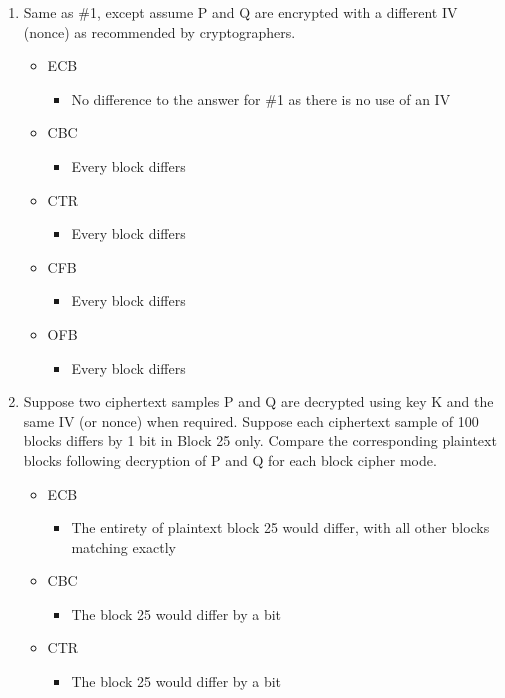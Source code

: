 \documentclass[11pt]{article}
\begin{document}
\begin{enumerate}
\begin{itemize}
\begin{itemize}
\end{itemize}
\end{itemize}
\item Same as \#1, except assume P and Q are encrypted with a different IV (nonce) as recommended by cryptographers.
\begin{itemize}
\item ECB
\begin{itemize}
\item No difference to the answer for \#1 as there is no use of an IV
\end{itemize}
\item CBC
\begin{itemize}
\item Every block differs
\end{itemize}
\item CTR
\begin{itemize}
\item Every block differs
\end{itemize}
\item CFB
\begin{itemize}
\item Every block differs
\end{itemize}
\item OFB
\begin{itemize}
\item Every block differs
\end{itemize}
\end{itemize}
\item Suppose two ciphertext samples P and Q are decrypted using key K and the same IV (or nonce) when required. Suppose each ciphertext sample of 100 blocks differs by 1 bit in Block 25 only. Compare the corresponding plaintext blocks following decryption of P and Q for each block cipher mode.
\begin{itemize}
\item ECB
\begin{itemize}
\item The entirety of plaintext block 25 would differ, with all other blocks matching exactly
\end{itemize}
\item CBC
\begin{itemize}
\item The block 25 would differ by a bit
\end{itemize}
\item CTR
\begin{itemize}
\item The block 25 would differ by a bit

\end{itemize}
\end{itemize}
\end{enumerate}
\end{document}
